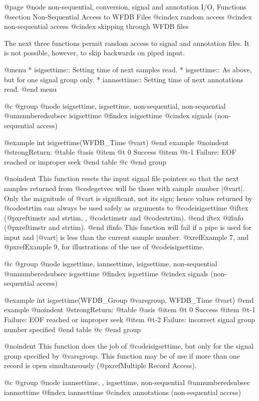 {{{{{{{{{@page
@node     non-sequential, conversion, signal and annotation I/O, Functions
@section Non-Sequential Access to WFDB Files
@cindex random access
@cindex non-sequential access
@cindex skipping through WFDB files

The next three functions permit random access to signal and annotation
files.  It is not possible, however, to skip backwards on piped
input.

@menu
* isigsettime::			Setting time of next samples read.
* isgsettime::			As above, but for one signal group only.
* iannsettime::			Setting time of next annotations read.
@end menu

@c @group
@node     isigsettime, isgsettime, non-sequential, non-sequential
@unnumberedsubsec isigsettime
@findex isigsettime
@cindex signals (non-sequential access)

@example
int isigsettime(WFDB_Time @var{t})
@end example
@noindent
@strong{Return:}
@table @asis
@item @t{ 0}
Success
@item @t{-1}
Failure: EOF reached or improper seek
@end table
@c @end group

@noindent
This function resets the input signal file pointers so that the next
samples returned from @code{getvec} will be those with sample number
|@var{t}|.  Only the magnitude of @var{t} is significant, not its sign;
hence values returned by @code{strtim} can always be used safely as
arguments to @code{isigsettime}
@iftex
(@pxref{timstr and strtim, , @code{timstr} and @code{strtim}}).
@end iftex
@ifinfo
(@pxref{timstr and strtim}).
@end ifinfo
This function will fail if a pipe is used for input and |@var{t}| is less
than the current sample number.  @xref{Example 7}, and @pxref{Example 9},
for illustrations of the use of @code{isigsettime}.

@c @group
@node     isgsettime, iannsettime, isigsettime, non-sequential
@unnumberedsubsec isgsettime
@findex isgsettime
@cindex signals (non-sequential access)

@example
int isgsettime(WFDB_Group @var{sgroup}, WFDB_Time @var{t})
@end example
@noindent
@strong{Return:}
@table @asis
@item @t{ 0}
Success
@item @t{-1}
Failure: EOF reached or improper seek
@item @t{-2}
Failure: incorrect signal group number specified
@end table
@c @end group

@noindent
This function does the job of @code{isigsettime}, but only for the signal
group specified by @var{sgroup}.  This function may be of use if more than
one record is open simultaneously (@pxref{Multiple Record Access}).

@c @group
@node     iannsettime, , isgsettime, non-sequential
@unnumberedsubsec iannsettime
@findex iannsettime
@cindex annotations (non-sequential access)

}}}}}}}}}
